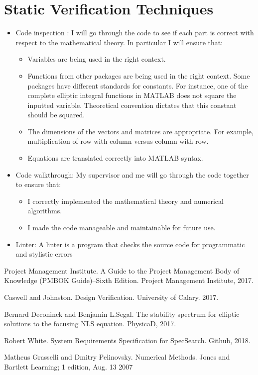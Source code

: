 \documentclass[12pt, titlepage]{article}
\begin{document}
\section{Static Verification Techniques}
\label{staticVertech}
\begin{itemize}
	\item Code inspection : I will 
	go through the code to see if each part is correct with respect to the
	mathematical theory. In particular I will ensure that: 
	\begin{itemize}
		\item Variables are being used in the right context. 
		\item Functions from other packages are being used in the right 
		context. Some packages have different standards for 
		constants. For instance, one of the complete elliptic integral 
		functions in MATLAB does not square the inputted variable. Theoretical 
		convention dictates that this constant should be squared. 
		\item The dimensions of the vectors and matrices are appropriate. For 
		example, multiplication of row with column versus column with row.
		\item Equations are translated correctly into MATLAB syntax.  
	\end{itemize} 
	\item Code walkthrough: My supervisor and me will go through the code 
	together to ensure that: 
	\begin{itemize}
		\item I correctly implemented the mathematical theory and numerical 
		algorithms.
		\item I made the code manageable and maintainable for future use.
	\end{itemize} 

	\item Linter: A linter is a program that checks the source code for 
	programmatic and stylistic errors
\end{itemize}
				


\newpage 
\begin{thebibliography}{9} 
	Project Management Institute. 
	A Guide to the Project Management Body of Knowledge (PMBOK Guide)–Sixth 
	Edition. 
	Project Management Institute, 2017. 
	
	Caswell and Johnston. 
	Design Verification. 
	University of Calary. 2017. 
	
	Bernard Deconinck and Benjamin L.Segal. 
	The stability spectrum for elliptic solutions to the focusing NLS equation. 
	PhysicaD, 2017. 
	 
	Robert White. 
	System Requirements Specification for SpecSearch. 
	Github, 2018. 
	
	Matheus Grasselli and Dmitry Pelinovsky. 
	Numerical Methods. 
	Jones and Bartlett Learning; 1 edition, Aug. 13 2007
	
\end{thebibliography} 
\end{document}
